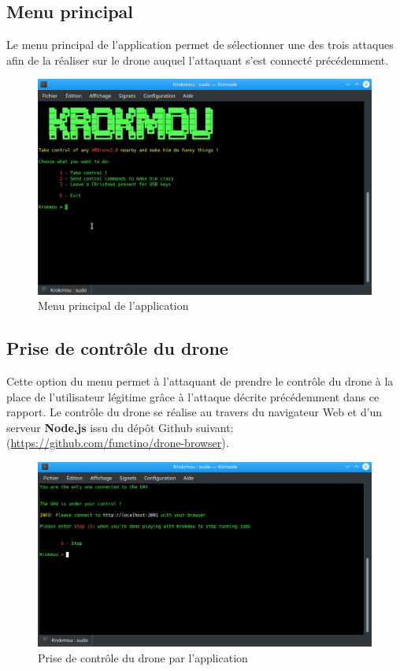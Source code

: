 \subsection{Menu principal}
Le menu principal de l'application permet de sélectionner une des trois attaques afin de la réaliser sur le drone auquel l'attaquant s'est connecté précédemment.

\begin{figure}[H]
  \centering
  \includegraphics[scale=0.35]{images/main_menu.png}
  \caption{Menu principal de l'application}
\end{figure}

\subsection{Prise de contrôle du drone}
Cette option du menu permet à l'attaquant de prendre le contrôle du drone à la place de l'utilisateur légitime grâce à l'attaque décrite précédemment dans ce rapport. Le contrôle du drone se réalise au travers du navigateur Web et d'un serveur \textbf{Node.js} issu du dépôt Github suivant: (\url{https://github.com/functino/drone-browser}).

\begin{figure}[H]
  \centering
  \includegraphics[scale=0.35]{images/taking_control.png}
  \caption{Prise de contrôle du drone par l'application}
\end{figure}

